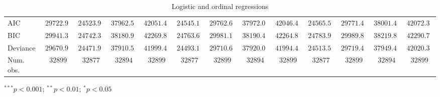 \begin{table}
\begin{center}
\begin{threeparttable}
\begin{tabular}{l c c c c c c c c c c c c}
AIC                             & $29722.90$    & $24523.98$    & $37962.55$    & $42051.41$    & $24545.19$    & $29762.68$    & $37972.02$    & $42046.44$    & $24565.54$    & $29771.46$    & $38001.44$    & $42072.32$    \\
BIC                             & $29941.33$    & $24742.39$    & $38180.98$    & $42269.84$    & $24763.61$    & $29981.11$    & $38190.45$    & $42264.87$    & $24783.96$    & $29989.89$    & $38219.86$    & $42290.75$    \\
Deviance                        & $29670.90$    & $24471.98$    & $37910.55$    & $41999.41$    & $24493.19$    & $29710.68$    & $37920.02$    & $41994.44$    & $24513.54$    & $29719.46$    & $37949.44$    & $42020.32$    \\
Num. obs.                       & $32899$       & $32877$       & $32894$       & $32899$       & $32877$       & $32899$       & $32894$       & $32899$       & $32877$       & $32899$       & $32894$       & $32899$       \\
\bottomrule
\end{tabular}
\begin{tablenotes}[flushleft]
\scriptsize{\item $^{***}p<0.001$; $^{**}p<0.01$; $^{*}p<0.05$}
\end{tablenotes}
\end{threeparttable}
\caption{Logistic and ordinal regressions}
\label{table:coefficients}
\end{center}
\end{table}
